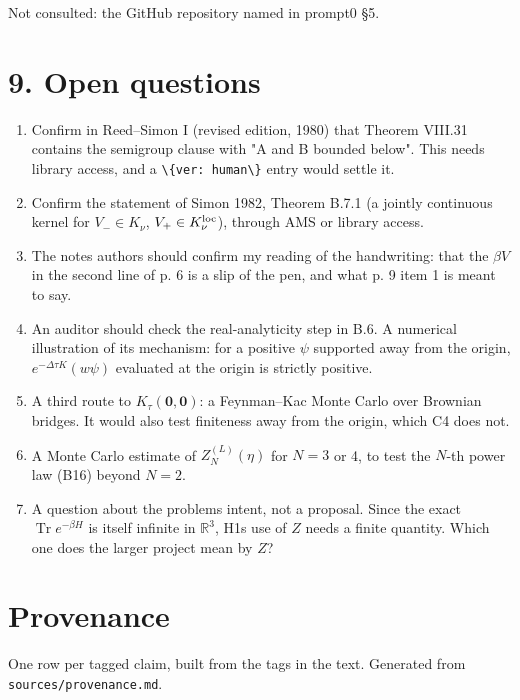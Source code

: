 \documentclass[11pt,a4paper]{article}
\providecommand{\passthrough}[1]{#1}
\providecommand{\tightlist}{\setlength{\itemsep}{0pt}\setlength{\parskip}{0pt}}
\begin{document}
Not consulted: the GitHub repository named in prompt0 §5.

\hypertarget{open-questions}{%
\section{9. Open questions}\label{open-questions}}

\begin{enumerate}
\def\labelenumi{\arabic{enumi}.}
\tightlist
\item
  Confirm in Reed--Simon I (revised edition, 1980) that Theorem VIII.31 contains the semigroup clause with "A and B bounded below". This needs library access, and a \passthrough{\lstinline!\{ver: human\}!} entry would settle it.
\item
  Confirm the statement of Simon 1982, Theorem B.7.1 (a jointly continuous kernel for \(V_-\in K_\nu\), \(V_+\in K_\nu^{\rm loc}\)), through AMS or library access.
\item
  The notes\textquotesingle{} authors should confirm my reading of the handwriting: that the \(\beta V\) in the second line of p. 6 is a slip of the pen, and what p. 9 item 1 is meant to say.
\item
  An auditor should check the real-analyticity step in B.6. A numerical illustration of its mechanism: for a positive \(\psi\) supported away from the origin, \(e^{-\Delta\tau K}(w\psi)\) evaluated at the origin is strictly positive.
\item
  A third route to \(K_\tau(\mathbf 0,\mathbf 0)\): a Feynman--Kac Monte Carlo over Brownian bridges. It would also test finiteness away from the origin, which C4 does not.
\item
  A Monte Carlo estimate of \(Z_N^{(L)}(\eta)\) for \(N=3\) or 4, to test the \(N\)-th power law (B16) beyond \(N=2\).
\item
  A question about the problem\textquotesingle s intent, not a proposal. Since the exact \(\operatorname{Tr}e^{-\beta H}\) is itself infinite in \(\mathbb R^3\), H1\textquotesingle s use of \(Z\) needs a finite quantity. Which one does the larger project mean by \(Z\)?
\end{enumerate}


\appendix

\section{Provenance}\label{app:provenance}
One row per tagged claim, built from the tags in the text. Generated from \texttt{sources/provenance.md}.
\end{document}
